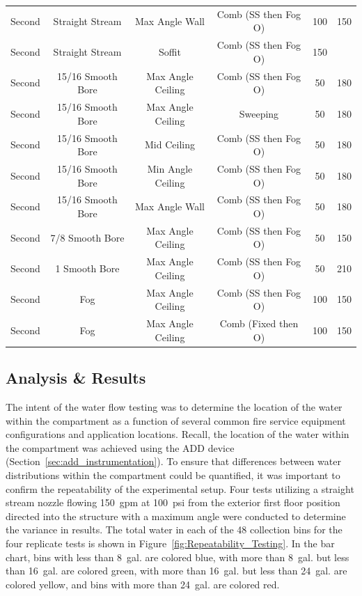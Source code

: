 \documentclass{article}
\begin{document}
\begin{table}[!ht]
\begin{tabular}{lccccc}
Second & Straight Stream    & Max Angle Wall         & Comb (SS then Fog O)    & 100 & 150 \\
Second & Straight Stream    & Soffit         		 & Comb (SS then Fog O)    & 150 \\
Second & 15/16 Smooth Bore  & Max Angle Ceiling      & Comb (SS then Fog O)    & 50 & 180 \\
Second & 15/16 Smooth Bore  & Max Angle Ceiling      & Sweeping       	       & 50 & 180 \\
Second & 15/16 Smooth Bore  & Mid Ceiling            & Comb (SS then Fog O)    & 50 & 180 \\
Second & 15/16 Smooth Bore  & Min Angle Ceiling      & Comb (SS then Fog O)    & 50 & 180 \\
Second & 15/16 Smooth Bore  & Max Angle Wall         & Comb (SS then Fog O)    & 50 & 180 \\
Second & 7/8 Smooth Bore    & Max Angle Ceiling      & Comb (SS then Fog O)    & 50 & 150 \\
Second & 1 Smooth Bore      & Max Angle Ceiling      & Comb (SS then Fog O)    & 50 & 210 \\
Second & Fog                & Max Angle Ceiling      & Comb (SS then Fog O)    & 100 & 150 \\
Second & Fog                & Max Angle Ceiling      & Comb (Fixed then O)     & 100 & 150 \\
\bottomrule[1.25pt]
\end{tabular}
\end{table}

\clearpage

\subsection{Analysis \& Results}

The intent of the water flow testing was to determine the location of the water within the compartment as a function of several common fire service equipment configurations and application locations. Recall, the location of the water within the compartment was achieved using the ADD device (Section~\ref{sec:add_instrumentation}). To ensure that differences between water distributions within the compartment could be quantified, it was important to confirm the repeatability of the experimental setup. Four tests utilizing a straight stream nozzle flowing 150~gpm at 100~psi from the exterior first floor position directed into the structure with a maximum angle were conducted to determine the variance in results. The total water in each of the 48 collection bins for the four replicate tests is shown in Figure~\ref{fig:Repeatability_Testing}. In the bar chart, bins with less than 8~gal. are colored blue, with more than 8~gal. but less than 16~gal. are colored green, with more than 16~gal. but less than 24~gal. are colored yellow, and bins with more than 24~gal. are colored red. 
\end{document}
